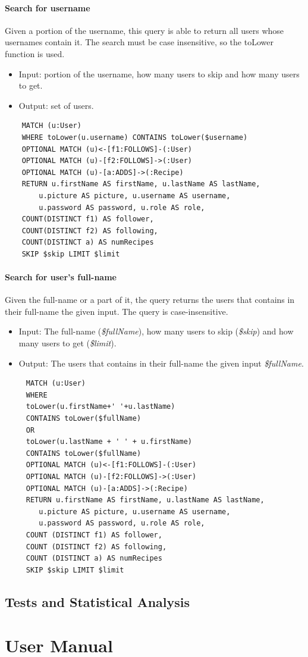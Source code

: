 \documentclass[a4paper]{report}
\begin{document}
\subsubsection{Search for username}
Given a portion of the username, this query is able to return all users whose usernames contain it. The search must be case insensitive, so the toLower function is used. 
\begin{itemize}
\item Input: portion of the username, how many users to skip and how many users to get.
\item Output: set of users.	
\end{itemize}
\lstset{ language=java}
\begin{lstlisting}
	MATCH (u:User)
	WHERE toLower(u.username) CONTAINS toLower($username)
	OPTIONAL MATCH (u)<-[f1:FOLLOWS]-(:User)
	OPTIONAL MATCH (u)-[f2:FOLLOWS]->(:User)
	OPTIONAL MATCH (u)-[a:ADDS]->(:Recipe)
	RETURN u.firstName AS firstName, u.lastName AS lastName, 
		u.picture AS picture, u.username AS username, 
		u.password AS password, u.role AS role, 
	COUNT(DISTINCT f1) AS follower,
	COUNT(DISTINCT f2) AS following, 
	COUNT(DISTINCT a) AS numRecipes
	SKIP $skip LIMIT $limit
\end{lstlisting} 
\subsubsection{Search for user's full-name}
Given the full-name or a part of it, the query returns the users that contains in their full-name the given input. The query is case-insensitive.
\begin{itemize}
	\item Input: The full-name (\emph{\$fullName}), how many users to skip (\emph{\$skip}) and how many users to get (\emph{\$limit}).
	\item Output: The users that contains in their full-name the given input \emph{\$fullName}.
\end{itemize}
\begin{lstlisting}
	 MATCH (u:User) 
	 WHERE
	 toLower(u.firstName+' '+u.lastName)
	 CONTAINS toLower($fullName)
	 OR
	 toLower(u.lastName + ' ' + u.firstName)
	 CONTAINS toLower($fullName)
	 OPTIONAL MATCH (u)<-[f1:FOLLOWS]-(:User)
	 OPTIONAL MATCH (u)-[f2:FOLLOWS]->(:User)
	 OPTIONAL MATCH (u)-[a:ADDS]->(:Recipe)
	 RETURN u.firstName AS firstName, u.lastName AS lastName,
	 	u.picture AS picture, u.username AS username,
	 	u.password AS password, u.role AS role,
	 COUNT (DISTINCT f1) AS follower,
	 COUNT (DISTINCT f2) AS following,
	 COUNT (DISTINCT a) AS numRecipes
	 SKIP $skip LIMIT $limit
\end{lstlisting} 

\section{Tests and Statistical Analysis}

\chapter{User Manual}
\end{document}

